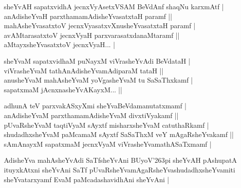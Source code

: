 \begin{entry}
\medskip
{}
\smallskip
\begin{shl}
sheYvAH sapatxvidhA jecnxVyAsetxVSAM BeVdAnf shaqNu karxmAtf |\\
anAdisheYvaH parxthamamAdisheYvasatxtaH paramf ||\\
mahAsheYvasatxtoV jecnxVyasatxvXnusheYvasatxtaH paramf |\\
avAMtarasatxtoV jecnxVyaH parxvarasatxdanaMtaramf ||\\
aMtayxsheYvasatxtoV jecnxVyaH... |
\end{shl}
\medskip
{}
\smallskip
\begin{shl}
sheYvaM sapatxvidhaM puNayxM viVrasheYvAdi BeVdataH |\\
viVrasheYvaM tathAnAdisheYvamAdiparaM tataH ||\\
anusheYvaM mahAsheYvaM yoVgasheYvaM tu SaSaThxkamf |\\
sapatxmaM jAcnxnasheYvAKayxM... ||
\end{shl}
\medskip
{}
\smallskip
\begin{shl}
adhunA teV parxvakASxyXmi sheYvaBeVdamanutatxmamf |\\
anAdisheYvaM parxthamamAdisheYvaM divxtiVyakamf ||\\
pUvaRsheYvaM taqtiVyaM sAyxtf misharxsheYvaM catuthaRkamf |\\
shudadhxsheYvaM paMcamaM sAyxtf SaSaThxM veY mAgaRsheYvakamf ||\\
sAmAnayxM sapatxmaM jecnxVyaM viVrasheYvamathASaTxmamf |
\end{shl}
\medskip
{}
\smallskip
\begin{shl}
AdisheYva mahAsheYvAdi SaTfsheYvAni BUyoV{\char'263}pi sheYvAH pAshupatA ituyxkAtxni sheYvAni SaTf pUvaRsheYvamAgaRsheYvashudadhxsheYvamiti sheYvatarxyamf EvaM paMcadashavidhAni sheYvAni |

\end{shl}
\end{entry}
